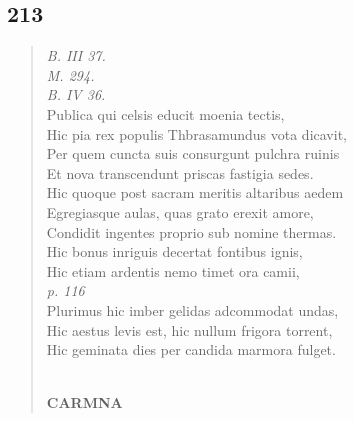 \documentclass[11pt, a4paper]{report}
\begin{document}
            \subsection*{213}
      \begin{verse}
      \textit{B. III 37.} \\ \textit{M. 294.} \\ \textit{B. IV 36.} \\ Publica qui celsis educit moenia tectis, \\ Hic pia rex populis Thbrasamundus vota dicavit, \\ Per quem cuncta suis consurgunt pulchra ruinis \\ Et nova transcendunt priscas fastigia sedes. \\ Hic quoque post sacram meritis altaribus aedem \\ Egregiasque aulas, quas grato erexit amore, \\ Condidit ingentes proprio sub nomine thermas. \\ Hic bonus inriguis decertat fontibus ignis, \\ Hic etiam ardentis nemo timet ora camii, \\ \textit{p. 116} \\ Plurimus hic imber gelidas adcommodat undas, \\ Hic aestus levis est, hic nullum frigora torrent, \\ Hic geminata dies per candida marmora fulget. \\ 
        ﻿\pagebreak 
     \marginpar{[182]} \begin{center} \textbf{CARMNA} \end{center}
      \end{verse}
  
\end{document}
